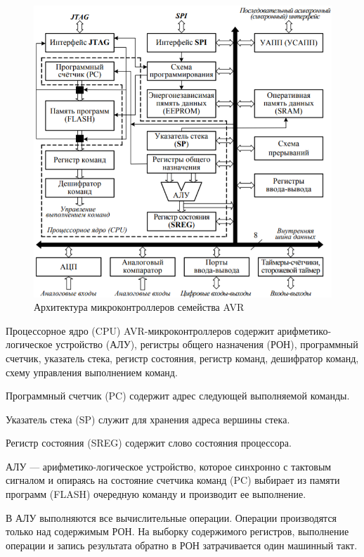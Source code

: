 \documentclass[12pt, oneside]{altsu-report}
\begin{document}
\begin{figure}[!ht]
    \centering
    \includegraphics{Architecture_AVR.png}
    \caption{Архитектура микроконтроллеров семейства AVR}
    \label{fig:architecture_arm}
\end{figure}

Процессорное ядро (CPU) AVR-микроконтроллеров содержит арифметико-ло\-гическое устройство (АЛУ), регистры общего назначения (РОН), программный счетчик, указатель стека, регистр состояния, регистр команд, дешифратор команд, схему управления выполнением команд. 

Программный счетчик (PC) содержит адрес следующей выполняемой команды.

Указатель стека (SP) служит для хранения адреса вершины стека.

Регистр состояния (SREG) содержит слово состояния процессора.

АЛУ --- арифметико-логическое устройство, которое синхронно с тактовым сигналом и опираясь на состояние счетчика команд (PC) выбирает из памяти программ (FLASH) очередную команду и производит ее выполнение.~\cite{AVR}

В АЛУ выполняются все вычислительные операции. Операции производятся только над содержимым РОН. На выборку содержимого регистров, выполнение операции и запись результата обратно в РОН затрачивается один машинный такт.
\end{document}
